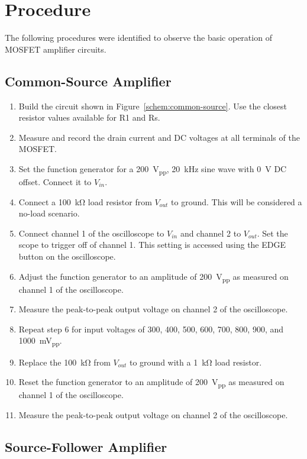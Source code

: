 \section{Procedure}
\label{sec:procedure}

The following procedures were identified to observe the basic operation of MOSFET amplifier circuits.

\subsection{Common-Source Amplifier}

\begin{enumerate}
\item Build the circuit shown in Figure~\ref{schem:common-source}.  Use the closest resistor values available for R1 and Rs.
\item Measure and record the drain current and DC voltages at all terminals of the MOSFET.
\item Set the function generator for a \SI{200}{V_{pp}}, \SI{20}{kHz} sine wave with \SI{0}{V} DC offset.  Connect it to $V_{in}$.
\item Connect a \SI{100}{\kilo\ohm} load resistor from $V_{out}$ to ground.  This will be considered a no-load scenario.
\item Connect channel 1 of the oscilloscope to $V_{in}$ and channel 2 to $V_{out}$.  Set the scope to trigger off of channel 1. This setting is accessed using the EDGE button on the oscilloscope.
\item Adjust the function generator to an amplitude of \SI{200}{V_{pp}} as measured on channel 1 of the oscilloscope.
\item Measure the peak-to-peak output voltage on channel 2 of the oscilloscope.
\item Repeat step 6 for input voltages of 300, 400, 500, 600, 700, 800, 900, and \SI{1000}{mV_{pp}}.
\item Replace the \SI{100}{\kilo\ohm} from $V_{out}$ to ground with a \SI{1}{\kilo\ohm} load resistor.
\item Reset the function generator to an amplitude of \SI{200}{V_{pp}} as measured on channel 1 of the oscilloscope.
\item Measure the peak-to-peak output voltage on channel 2 of the oscilloscope.
\end{enumerate}

\subsection{Source-Follower Amplifier}


